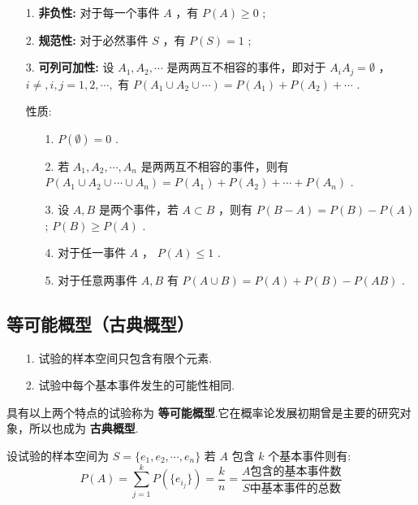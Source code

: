 \documentclass[UTF8]{ctexart}
\begin{document}
	\begin{enumerate}
		\item [1.] { \textbf{非负性:} 对于每一个事件 $ A $ ，有 $ P(A) \ge 0 $ ;}
		\item [2.] { \textbf{规范性:} 对于必然事件 $ S $ ，有 $ P(S)=1 $ ;}
		\item [3.] { \textbf{可列可加性:} 设 $ A_{1},A_{2}, \cdots $ 是两两互不相容的事件，即对于 $ A_{i}A_{j}= \emptyset $ ， $ i \neq ,i,j=1,2, \cdots , $ 有 $ P(A_{1} \cup A_{2} \cup \cdots)=P(A_{1})+P(A_{2})+ \cdots $ .}
	\end{enumerate}

	\begin{itemize}
		\item [性质:] {
			\begin{enumerate}
				\item [1.] { $ P( \emptyset )=0 $ .}
				\item [2.] {若 $ A_{1},A_{2}, \cdots ,A_{n} $ 是两两互不相容的事件，则有 $ P(A_{1} \cup A_{2} \cup \cdots \cup A_{n})=P(A_{1})+P(A_{2})+ \cdots +P(A_{n}) $ .}
				\item [3.] {设 $ A,B $ 是两个事件，若 $A \subset B$ ，则有 $ P(B-A)=P(B)-P(A) $ ; $ P(B) \ge P(A) $ .}
				\item [4.] {对于任一事件 $ A $ ， $ P(A) \le 1 $ .}
				\item [5.] {对于任意两事件 $ A,B $ 有 $ P(A \cup B)=P(A)+P(B)-P(AB) $ .}
			\end{enumerate}
		}
	\end{itemize}
	
	\subsection{等可能概型（古典概型）}
	
	\begin{enumerate}
		\item [1.] {试验的样本空间只包含有限个元素.}
		\item [2.] {试验中每个基本事件发生的可能性相同.}
	\end{enumerate}

	{具有以上两个特点的试验称为 \textbf{等可能概型}.它在概率论发展初期曾是主要的研究对象，所以也成为 \textbf{古典概型}.}
	
	{设试验的样本空间为 $ S=\{e_{1},e_{2}, \cdots ,e_{n}\}$ 若 $ A $ 包含 $ k $ 个基本事件则有: \\ $$ P(A)=\sum\limits_{j=1}^{k}P(\{e_{i_{j}}\})= \frac{k}{n} = \frac{A \mbox{包含的基本事件数} }{S \mbox{中基本事件的总数} } $$ }
	
\end{document}
